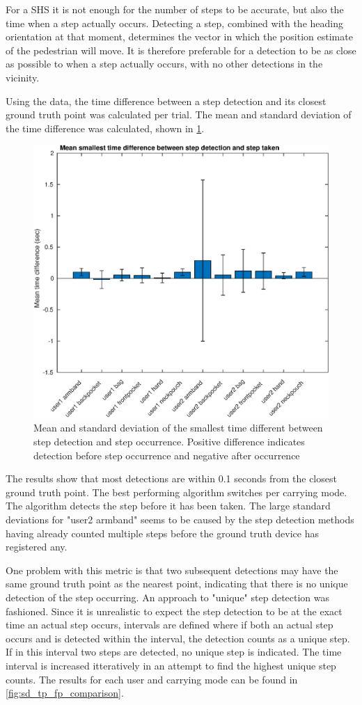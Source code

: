 For a \ac{SHS} it is not enough for the number of steps to be accurate, but also the time when a step actually occurs. Detecting a step, combined with the heading orientation at that moment, determines the vector in which the position estimate of the pedestrian will move. It is therefore preferable for a detection to be as close as possible to when a step actually occurs, with no other detections in the vicinity. \par
Using the \citet{Salvi2018} data, the time difference between a step detection and its closest ground truth point was calculated per trial. The mean and standard deviation of the time difference was calculated, shown in \cref{fig:202011130914smallest_diff_to_gt_1}. 

\begin{figure}[H]
	\centering
	\includegraphics[width=0.7\linewidth]{images/20201127_1607_Mean_smallest_time_difference_between_step_detection_and_step_taken}
	\caption{Mean and standard deviation of the smallest time different between step detection and step occurrence. Positive difference indicates detection before step occurrence and negative after occurrence}
	\label{fig:202011130914smallest_diff_to_gt_1}
\end{figure}

The results show that most detections are within 0.1 seconds from the closest ground truth point. The best performing algorithm switches per carrying mode. The \citet{Salvi2018} algorithm detects the step before it has been taken. The large standard deviations for "user2 armband" seems to be caused by the step detection methods having already counted multiple steps before the ground truth device has registered any.

One problem with this metric is that two subsequent detections may have the same ground truth point as the nearest point, indicating that there is no unique detection of the step occurring. An approach to "unique" step detection was fashioned. Since it is unrealistic to expect the step detection to be at the exact time an actual step occurs, intervals are defined where if both an actual step occurs and is detected within the interval, the detection counts as a unique step. If in this interval two steps are detected, no unique step is indicated. The time interval is increased itteratively in an attempt to find the highest unique step counts. The results for each user and carrying mode can be found in \cref{fig:sd_tp_fp_comparison}. 

